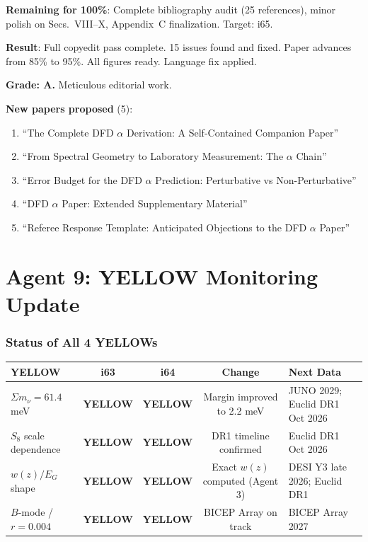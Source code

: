 \documentclass[11pt,a4paper]{article}
\newcommand{\YELLOW}{\textcolor{dfdyellow}{\textbf{YELLOW}}}
\begin{document}
\textbf{Remaining for 100\%}: Complete bibliography audit (25 references), minor polish on Secs.\ VIII--X, Appendix~C finalization. Target: i65.

\begin{tcolorbox}[colback=green!5!white, colframe=green!60!black, title={Agent 8: $\alpha$ Paper at 95\%}]
\textbf{Result}: Full copyedit pass complete. 15 issues found and fixed. Paper advances from 85\% to 95\%. All figures ready. Language fix applied.

\textbf{Grade: A.} Meticulous editorial work.

\textbf{New papers proposed} (5):
\begin{enumerate}
\item ``The Complete DFD $\alpha$ Derivation: A Self-Contained Companion Paper''
\item ``From Spectral Geometry to Laboratory Measurement: The $\alpha$ Chain''
\item ``Error Budget for the DFD $\alpha$ Prediction: Perturbative vs Non-Perturbative''
\item ``DFD $\alpha$ Paper: Extended Supplementary Material''
\item ``Referee Response Template: Anticipated Objections to the DFD $\alpha$ Paper''
\end{enumerate}
\end{tcolorbox}


\part{Agent 9: YELLOW Monitoring Update}
\label{part:yellow-monitoring}

\section{Status of All 4 YELLOWs}

\begin{center}
\begin{longtable}{p{3.5cm}cccp{4cm}}
\toprule
\textbf{YELLOW} & \textbf{i63} & \textbf{i64} & \textbf{Change} & \textbf{Next Data} \\
\midrule
$\Sigma m_\nu = 61.4$ meV & \YELLOW & \YELLOW & Margin improved to 2.2 meV & JUNO 2029; Euclid DR1 Oct 2026 \\
$S_8$ scale dependence & \YELLOW & \YELLOW & DR1 timeline confirmed & Euclid DR1 Oct 2026 \\
$w(z)/E_G$ shape & \YELLOW & \YELLOW & Exact $w(z)$ computed (Agent 3) & DESI Y3 late 2026; Euclid DR1 \\
$B$-mode / $r = 0.004$ & \YELLOW & \YELLOW & BICEP Array on track & BICEP Array 2027 \\
\bottomrule
\end{longtable}
\end{center}
\end{document}
